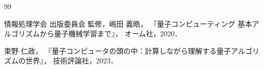 \renewcommand{\bibname}{参考文献}

\begin{thebibliography}{99}
  情報処理学会 出版委員会 監修，嶋田 義皓，
  『量子コンピューティング 基本アルゴリズムから量子機械学習まで』，
  オーム社，2020．

  束野 仁政，
  『量子コンピュータの頭の中：計算しながら理解する量子アルゴリズムの世界』，
  技術評論社，2023．
\end{thebibliography}
